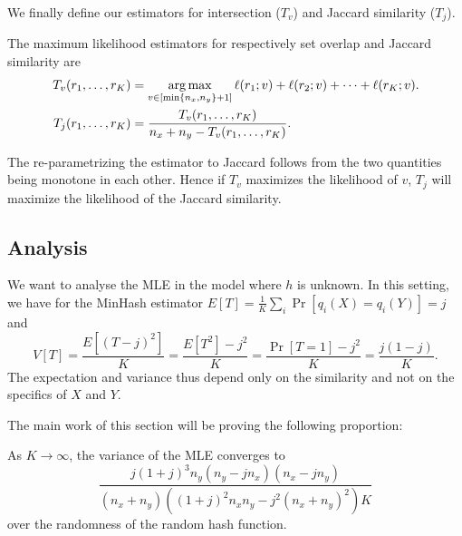 We finally define our estimators for intersection ($T_v$) and Jaccard similarity ($T_j$).
\begin{definition}
   The maximum likelihood estimators for respectively set overlap and Jaccard similarity are
   \begin{align}
      T_v(r_1,\dots,r_K) &= \operatorname*{arg\,max}_{v\in[\min\{n_x,n_y\}+1]} \ell(r_1; v) + \ell(r_2; v) + \dots + \ell(r_K; v).
      \\T_j(r_1,\dots,r_K) &= \frac{T_v(r_1,\dots,r_K)}{n_x+n_y - T_v(r_1,\dots,r_K)}.
   \end{align}
\end{definition}
%
The re-parametrizing the estimator to Jaccard follows from the two quantities being monotone in each other.
Hence if $T_v$ maximizes the likelihood of $v$, $T_j$ will maximize the likelihood of the Jaccard similarity.

\subsection{Analysis}\label{sec:analysis}

We want to analyse the MLE in the model where $h$ is unknown.
   In this setting, we have for the MinHash estimator $E[T]=\frac1K\sum_i\Pr[q_i(X)=q_i(Y)] = j$ and
\[
   V[T] =
   \frac{E[(T-j)^2]}{K}
      = \frac{E[T^2] - j^2}{K}
      = \frac{\Pr[T=1] - j^2}{K}
      = \frac{j(1-j)}{K}.
      \label{eq:minvar}
\]
The expectation and variance thus depend only on the similarity and not on the specifics of $X$ and $Y$.

The main work of this section will be proving the following proportion:
\begin{proposition}\label{prop:mle_var}
   As $K\to\infty$, the variance of the MLE converges to
   \[
      \frac{j (1+j)^3 n_y (n_y-j n_x) (n_x-j n_y)}{(n_x+n_y) \left((1+j)^2 n_xn_y - j^2 (n_x+n_y)^2\right)K}
   \label{eq:mle_var}
   \]
   over the randomness of the random hash function.
\end{proposition}

